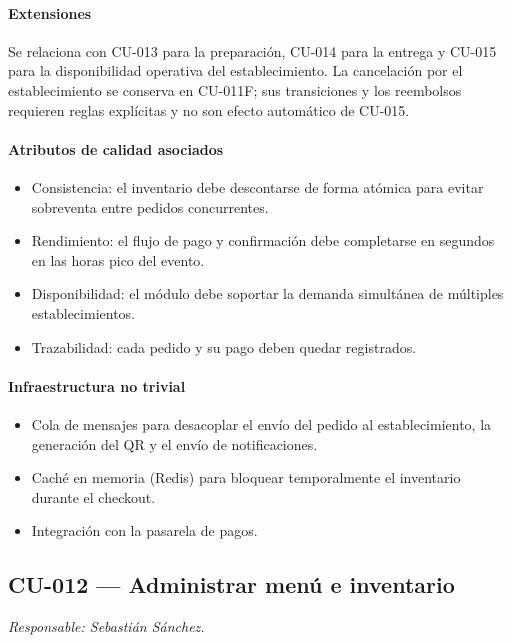 \paragraph{Extensiones}
Se relaciona con CU-013 para la preparación, CU-014 para la entrega y CU-015 para la disponibilidad operativa del establecimiento. La cancelación por el establecimiento se conserva en CU-011F; sus transiciones y los reembolsos requieren reglas explícitas y no son efecto automático de CU-015.

\paragraph{Atributos de calidad asociados}
\begin{itemize}[leftmargin=1.4em, topsep=1pt]
  \item Consistencia: el inventario debe descontarse de forma atómica para evitar sobreventa entre pedidos concurrentes.
  \item Rendimiento: el flujo de pago y confirmación debe completarse en segundos en las horas pico del evento.
  \item Disponibilidad: el módulo debe soportar la demanda simultánea de múltiples establecimientos.
  \item Trazabilidad: cada pedido y su pago deben quedar registrados.
\end{itemize}

\paragraph{Infraestructura no trivial}
\begin{itemize}[leftmargin=1.4em, topsep=1pt]
  \item Cola de mensajes para desacoplar el envío del pedido al establecimiento, la generación del QR y el envío de notificaciones.
  \item Caché en memoria (Redis) para bloquear temporalmente el inventario durante el checkout.
  \item Integración con la pasarela de pagos.
\end{itemize}

\subsection{CU-012 --- Administrar menú e inventario}
\label{cu:cu-012}
\textit{Responsable: Sebastián Sánchez.}

